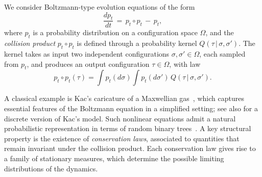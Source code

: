 \documentclass[11pt,reqno]{amsart}
\numberwithin{equation}{section}
\numberwithin{figure}{section}
\newcommand{\1}{\mathds{1}}
\newcommand{\tc}{\,|\,}
\begin{document}
%
%
%

We consider Boltzmann-type evolution equations of the form  
\begin{equation}
\label{non-linear rqs0}
    \frac{d p_t}{dt} \,=\, p_t \circ p_t \,-\, p_t,
\end{equation}
where \( p_t \) is a probability distribution on a configuration space \( \Omega \), and the \emph{collision product} \( p_t \circ p_t \) is defined through a probability kernel \( Q(\tau \tc \sigma, \sigma') \).  
The kernel takes as input two independent configurations \( \sigma, \sigma' \in \Omega \), each sampled from \( p_t \), and produces an output configuration \( \tau \in \Omega \), with law
\begin{equation}
\label{non-linear rqs00}
 p_t \circ p_t(\tau) = \int p_t(d\sigma) \int p_t(d\sigma') \, Q(\tau \tc \sigma, \sigma') .
\end{equation}

A classical example is Kac's caricature of a Maxwellian gas~\cite{Kac_pr}, which captures essential features of the Boltzmann equation in a simplified setting; see also \cite{Bertini_et_al} for a discrete version of Kac's model. 
Such nonlinear equations admit a natural probabilistic representation in terms of random binary trees~\cite{Wild,mckean}.  
A key structural property is the existence of \emph{conservation laws}, associated to quantities that remain invariant under the collision product.  
Each conservation law gives rise to a family of stationary measures, which determine the possible limiting distributions of the dynamics.
\end{document}
